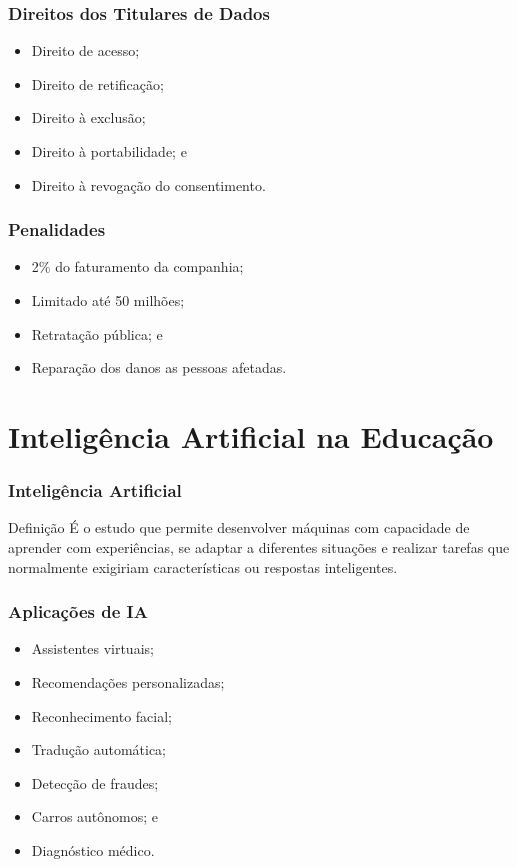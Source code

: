 \documentclass[aspectratio=169]{beamer} %
\begin{document}
\begin{frame}
	\frametitle{Direitos dos Titulares de Dados}
	
	\begin{itemize}
		\item Direito de acesso;
		\item Direito de retificação;
		\item Direito à exclusão;
		\item Direito à portabilidade; e
		\item Direito à revogação do consentimento.
	\end{itemize}
\end{frame}

\begin{frame}
	\frametitle{Penalidades}
	
	\begin{itemize}
		\item 2$\%$ do faturamento da companhia;
		\item Limitado até 50 milhões;
		\item Retratação pública; e
		\item Reparação dos danos as pessoas afetadas.
	\end{itemize}
\end{frame}

\section{Inteligência Artificial na Educação}

\begin{frame}
	\frametitle{Inteligência Artificial}
	
	\begin{block}{Definição}
		É  o estudo que permite desenvolver máquinas com capacidade de  aprender com experiências, se adaptar a diferentes situações e realizar tarefas que normalmente exigiriam características ou respostas inteligentes.
	\end{block}
\end{frame}

\begin{frame}
	\frametitle{Aplicações de IA}
	
	\begin{itemize}
		\item Assistentes virtuais;
		\item Recomendações personalizadas;
		\item Reconhecimento facial;
		\item Tradução automática;
		\item Detecção de fraudes;
		\item Carros autônomos; e
		\item Diagnóstico médico.
	\end{itemize}
\end{frame}
\end{document}
